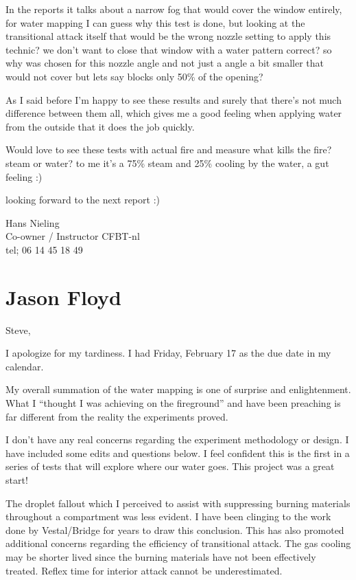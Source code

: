\documentclass[12pt,oneside]{book}
\begin{document}
\begin{appendix}
In the reports it talks about a narrow fog that would cover the window entirely, for water mapping I can guess why this test is done, but looking at the transitional attack itself that would be the wrong nozzle setting to apply this technic? we don't want to close that window with a water pattern correct? so why was chosen for this nozzle angle and not just a angle a bit smaller that would not cover but lets say blocks only 50\% of the opening?
 
As I said before I'm happy to see these results and surely that there's not much difference between them all, which gives me a good feeling when applying water from the outside that it does the job quickly.

Would love to see these tests with actual fire and measure what kills the fire? steam or water? to me it's a 75\% steam and 25\% cooling by the water, a gut feeling :)
 
looking forward to the next report :)
 

Hans Nieling \\
Co-owner / Instructor CFBT-nl \\
tel; 06 14 45 18 49 \\

\section{Jason Floyd}

Steve, 

I apologize for my tardiness. I had Friday, February 17 as the due date in my calendar.
 
My overall summation of the water mapping is one of surprise and enlightenment. What I ``thought I was achieving on the fireground'' and have been preaching is far different from the reality the experiments proved.
 
I don't have any real concerns regarding the experiment methodology or design. I have included some edits and questions below. I feel confident this is the first in a series of tests that will explore where our water goes. This project was a great start!
 
The droplet fallout which I perceived to assist with suppressing burning materials throughout a compartment was less evident. I have been clinging to the work done by Vestal/Bridge for years to draw this conclusion. This has also promoted additional concerns regarding the efficiency of transitional attack. The gas cooling may be shorter lived since the burning materials have not been effectively treated. Reflex time for interior attack cannot be underestimated.
 

\end{appendix}
\end{document}
